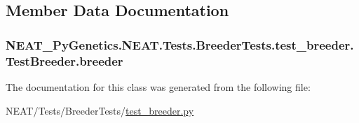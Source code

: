 \subsection{Member Data Documentation}
\subsubsection[{\texorpdfstring{breeder}{breeder}}]{\setlength{\rightskip}{0pt plus 5cm}N\+E\+A\+T\+\_\+\+Py\+Genetics.\+N\+E\+A\+T.\+Tests.\+Breeder\+Tests.\+test\+\_\+breeder.\+Test\+Breeder.\+breeder}\hypertarget{classNEAT__PyGenetics_1_1NEAT_1_1Tests_1_1BreederTests_1_1test__breeder_1_1TestBreeder_abc027b8c1ce451c04c5eae1fe983c40b}{}\label{classNEAT__PyGenetics_1_1NEAT_1_1Tests_1_1BreederTests_1_1test__breeder_1_1TestBreeder_abc027b8c1ce451c04c5eae1fe983c40b}


The documentation for this class was generated from the following file\+:\begin{DoxyCompactItemize}
\item 
N\+E\+A\+T/\+Tests/\+Breeder\+Tests/\hyperlink{test__breeder_8py}{test\+\_\+breeder.\+py}\end{DoxyCompactItemize}

